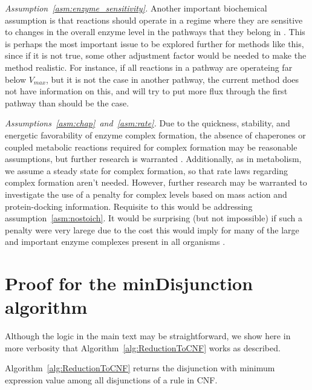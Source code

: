 \emph{Assumption~\ref{asm:enzyme_sensitivity}.}
Another important biochemical assumption is that reactions should
operate in a regime where they are sensitive to changes in the overall
enzyme level in the pathways that they belong in
\citep{Bennett2009,Chubukov2013}. This is perhaps the most important
issue to be explored further for methods like this, since if it is not
true, some other adjustment factor would be needed to make the method
realistic. For instance, if all reactions in a pathway are operateing
far below $V_{max}$, but it is not the case in another pathway, the
current method does not have information on this, and will try to put
more flux through the first pathway than should be the case.

\emph{Assumptions~\ref{asm:chap}~and~\ref{asm:rate}.}
Due to the quickness, stability, and energetic favorability of enzyme
complex formation, the absence of chaperones or coupled metabolic
reactions required for complex formation may be reasonable
assumptions, but further research is warranted \citep{Karr2012}.
Additionally, as in metabolism, we assume a steady state for complex
formation, so that rate laws regarding complex formation aren't
needed. However, further research may be warranted to investigate the
use of a penalty for complex levels based on mass action and
protein-docking information. Requisite to this would be addressing
assumption~\ref{asm:nostoich}. It would be surprising (but not
impossible) if such a penalty were very larege due to the cost this
would imply for many of the large and important enzyme complexes
present in all organisms \citep{Nelson2008}.

\section{Proof for the minDisjunction algorithm}

Although the logic in the main text may be straightforward, we show
here in more verbosity that Algorithm~\ref{alg:ReductionToCNF} works
as described.

\begin{Theorem}
\label{thm:ReductionToCNF}
Algorithm~\ref{alg:ReductionToCNF} returns the disjunction with
minimum expression value among all disjunctions of a rule in CNF.
\end{Theorem}

